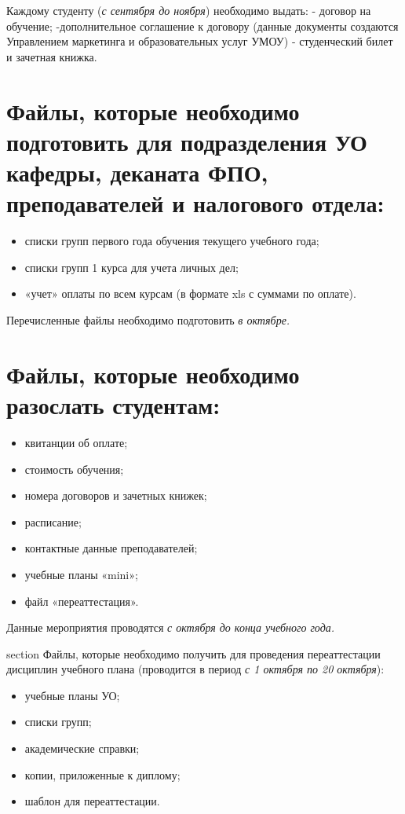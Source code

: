 \documentclass[utf8]{article}
\begin{document}
\begin{flushleft}
\section{}
Каждому студенту  (\textit {с сентября до ноября}) необходимо выдать:
- договор на обучение;
-дополнительное соглашение к договору (данные документы создаются Управлением маркетинга и образовательных услуг УМОУ)
- студенческий билет и зачетная книжка.


\section{Файлы, которые необходимо подготовить для подразделения УО кафедры, деканата ФПО, преподавателей и налогового отдела:}
\begin{itemize}

\item списки групп первого года обучения текущего учебного года;
\item списки групп 1 курса для учета личных дел;
\item «учет» оплаты по всем курсам (в формате xls с суммами по оплате).

\end{itemize}
Перечисленные файлы необходимо подготовить \textit {в октябре.}
\section{Файлы, которые необходимо разослать студентам:}

\begin{itemize}

\item квитанции об оплате;
\item стоимость обучения;
\item номера договоров и зачетных книжек;
\item расписание;
\item контактные данные преподавателей;
\item учебные планы «mini»;
\item файл «переаттестация».

\end{itemize}

Данные мероприятия проводятся \textit {с октября до конца учебного года.}

section {Файлы, которые необходимо получить для проведения переаттестации дисциплин учебного плана (проводится в период \textit {с 1 октября по 20 октября}): }

\begin{itemize}

\item учебные планы УО;
\item списки групп;
\item академические справки;
\item копии, приложенные к диплому;
\item шаблон для переаттестации.

\end{itemize}




\end{flushleft}
\end{document}
